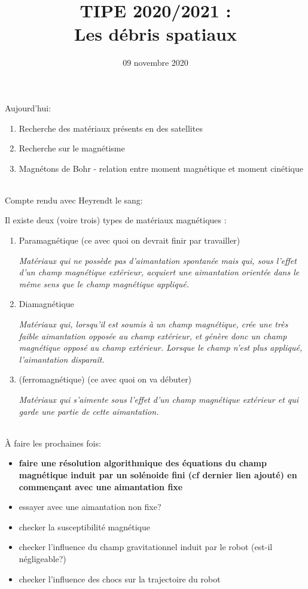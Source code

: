 \documentclass[a4paper,1pt]{article}
\title{TIPE 2020/2021 : \\ Les débris spatiaux}
\date{09 novembre 2020}
\begin{document}
 \maketitle
    Aujourd'hui:
    \begin{enumerate}
        \item Recherche des matériaux présents en des satellites
        \item Recherche sur le magnétisme
        \item Magnétons de Bohr - relation entre moment magnétique et moment cinétique
    \end{enumerate}
    ~\\

    Compte rendu avec Heyrendt le sang:

    Il existe deux (voire trois) types de matériaux magnétiques :
    \begin{enumerate}
        \item Paramagnétique (ce avec quoi on devrait finir par travailler)
        
        \emph{Matériaux qui ne possède pas d'aimantation spontanée mais qui, sous l'effet d'un champ magnétique extérieur, acquiert une aimantation orientée dans le même sens que le champ magnétique appliqué.}
        \item Diamagnétique
        
        \emph{Matériaux qui, lorsqu'il est soumis à un champ magnétique, crée une très faible aimantation opposée au champ extérieur, et génère donc un champ magnétique opposé au champ extérieur. Lorsque le champ n’est plus appliqué, l’aimantation disparaît.}
        \item (ferromagnétique) (ce avec quoi on va débuter)
        
        \emph{Matériaux qui s'aimente sous l'effet d'un champ magnétique extérieur et qui garde une partie de cette aimantation.}
    \end{enumerate}    
~\\

À faire les prochaines fois:
\begin{itemize}
    \item \textbf{faire une résolution algorithmique des équations du champ magnétique induit par un solénoide fini (cf dernier lien ajouté) en commençant avec une aimantation fixe}
    \item essayer avec une aimantation non fixe?
    \item checker la susceptibilité magnétique
    \item checker l'influence du champ gravitationnel induit par le robot (est-il négligeable?)
    \item checker l'influence des chocs sur la trajectoire du robot 
\end{itemize}
\end{document}
